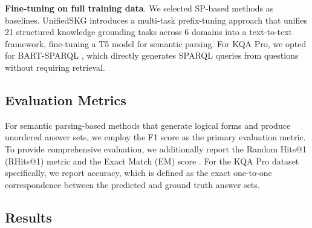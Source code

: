 \textbf{Fine-tuning on full training data}. 
We selected SP-based methods as baselines. UnifiedSKG \citep{Xie-Tianbao-EMNLP-2022-UnifiedSKG} introduces a multi-task prefix-tuning approach that unifies 21 structured knowledge grounding tasks across 6 domains into a text-to-text framework, fine-tuning a T5 model for semantic parsing. For KQA Pro, we opted for BART-SPARQL \citep{Cao-Shulin-ACL-2022-KQAPro}, which directly generates SPARQL queries from questions without requiring retrieval.

\subsection{Evaluation Metrics}

For semantic parsing-based methods that generate logical forms and produce unordered answer sets, we employ the F1 score as the primary evaluation metric. 
To provide comprehensive evaluation, we additionally report the Random Hits@1 (RHits@1) metric \citep{Shu-Yiheng-EMNLP-2022-TIARA} and the Exact Match (EM) score \citep{Talmor-Alon-NAACL-2018-ComplexWebQuestions-CWQ}. 
For the KQA Pro dataset specifically, we report accuracy, which is defined as the exact one-to-one correspondence between the predicted and ground truth answer sets.

\subsection{Results}

